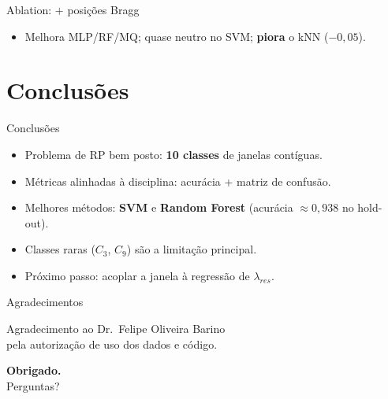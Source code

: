 \documentclass[aspectratio=169,11pt]{beamer}
\begin{document}
\begin{frame}{Ablation: $+$ posições Bragg}
  \begin{itemize}
    \item Melhora MLP/RF/MQ; quase neutro no SVM; \textbf{piora} o kNN ($-0{,}05$).
  \end{itemize}
\end{frame}

\section{Conclusões}

\begin{frame}{Conclusões}
  \begin{itemize}
    \item Problema de RP bem posto: \textbf{10 classes} de janelas contíguas.
    \item Métricas alinhadas à disciplina: acurácia + matriz de confusão.
    \item Melhores métodos: \textbf{SVM} e \textbf{Random Forest} (acurácia ${\approx}0{,}938$ no hold-out).
    \item Classes raras ($C_3$, $C_9$) são a limitação principal.
    \item Próximo passo: acoplar a janela à regressão de $\lambda_{res}$.
  \end{itemize}
\end{frame}

\begin{frame}{Agradecimentos}
  \begin{center}
    Agradecimento ao Dr.~Felipe Oliveira Barino\\
    pela autorização de uso dos dados e código.
    \vspace{1.2em}

    \textbf{Obrigado.}\\[0.5em]
    Perguntas?
  \end{center}
\end{frame}
\end{document}
